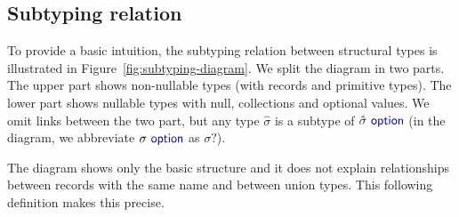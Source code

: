 \documentclass[preprint]{sigplanconf}
\newcommand{\kvd}[1]{\textnormal{\textcolor{kvdclr}{\sffamily #1}}}
\begin{document}


\subsection{Subtyping relation}
\label{sec:inference-subtyping}

To provide a basic intuition, the subtyping relation between structural types is illustrated in
Figure~\ref{fig:subtyping-diagram}. We split the diagram in two parts. The upper part shows 
non-nullable types (with records and primitive types). The lower part shows nullable types with 
\kvd{null}, collections and optional values. We omit links between the two part, but any type
$\hat{\sigma}$ is a subtype of $\hat{\sigma}~\kvd{option}$ (in the diagram, we abbreviate 
$\sigma~\kvd{option}$ as $\sigma?$).

The diagram shows only the basic structure and it does not explain relationships between records
with the same name and between union types. This following definition makes this precise.
\end{document}
